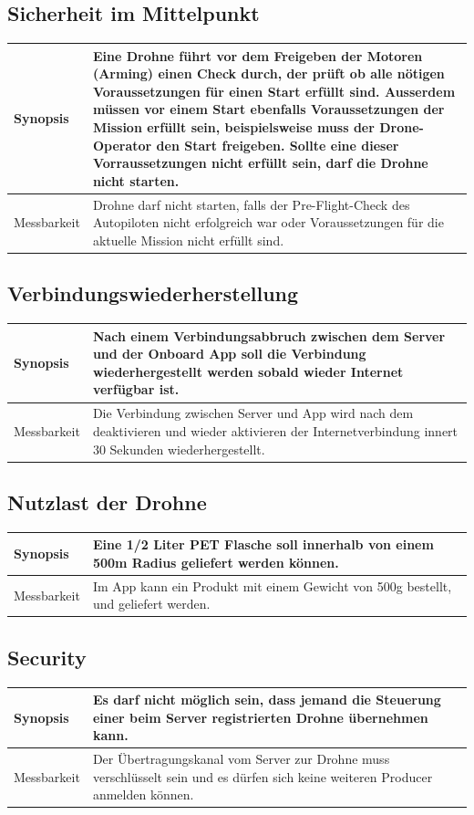 \subsection{Sicherheit im Mittelpunkt}
\begin{tabular}{|p{}|p{}|} \hline
	Synopsis & Eine Drohne führt vor dem Freigeben der Motoren (Arming) einen Check durch, der prüft ob alle nötigen Voraussetzungen für einen Start erfüllt sind. Ausserdem müssen vor einem Start ebenfalls Voraussetzungen der Mission erfüllt sein, beispielsweise muss der Drone-Operator den Start freigeben. Sollte eine dieser Vorraussetzungen nicht erfüllt sein, darf die Drohne nicht starten.  \\ \hline
	
	Messbarkeit & Drohne darf nicht starten, falls der Pre-Flight-Check des Autopiloten nicht erfolgreich war oder Voraussetzungen für die aktuelle Mission nicht erfüllt sind. \\ \hline
\end{tabular}
\subsection{Verbindungswiederherstellung}
\begin{tabular}{|p{}|p{}|} \hline
	Synopsis & Nach einem Verbindungsabbruch zwischen dem Server und der Onboard App soll die Verbindung wiederhergestellt werden sobald wieder Internet verfügbar ist. \\ \hline
	
	Messbarkeit & Die Verbindung zwischen Server und App wird nach dem deaktivieren und wieder aktivieren der Internetverbindung innert 30 Sekunden wiederhergestellt.\\ \hline
\end{tabular}
\subsection{Nutzlast der Drohne}
\begin{tabular}{|p{}|p{}|} \hline
	Synopsis & Eine 1/2 Liter PET Flasche soll innerhalb von einem 500m Radius geliefert werden können. \\ \hline
	Messbarkeit & Im App kann ein Produkt mit einem Gewicht von 500g bestellt, und geliefert werden. \\ \hline
\end{tabular}
\subsection{Security}
\begin{tabular}{|p{}|p{}|} \hline
	Synopsis & Es darf nicht möglich sein, dass jemand die Steuerung einer beim Server registrierten Drohne übernehmen kann.\\ \hline
	Messbarkeit & Der Übertragungskanal vom Server zur Drohne muss verschlüsselt sein und es dürfen sich keine weiteren Producer anmelden können.\\ \hline
\end{tabular}
